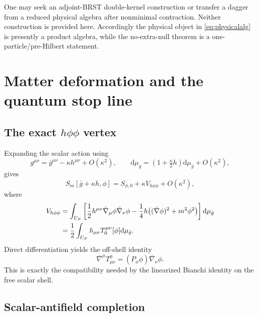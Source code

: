 \documentclass[11pt]{article}
\theoremstyle{definition}
\theoremstyle{remark}
\newcommand{\U}{U_{F}}
\newcommand{\gbar}{\bar g}
\newcommand{\dd}{\mathrm d}
\begin{document}
One may seek an adjoint-BRST double-kernel construction or transfer a dagger from a
reduced physical algebra after nonminimal contraction.  Neither construction is
provided here.  Accordingly the physical object in \cref{eq:physicalalg} is presently
a product algebra, while the no-extra-null theorem is a one-particle/pre-Hilbert
statement.

\section{Matter deformation and the quantum stop line}

\subsection{The exact \texorpdfstring{$h\phi\phi$}{h-phi-phi} vertex}

Expanding the scalar action using
\begin{equation}
 g^{\mu\nu}=\gbar^{\mu\nu}-\kappa h^{\mu\nu}+O(\kappa^2),
 \qquad
 \dd\mu_g=(1+\tfrac\kappa2h)\dd\mu_{\gbar}+O(\kappa^2),
\end{equation}
gives
\begin{equation}
 S_m[\gbar+\kappa h,\phi]
 =S_{\phi,0}+\kappa V_{h\phi\phi}+O(\kappa^2),
\end{equation}
where
\begin{align}
 V_{h\phi\phi}
 &=\int_{\U}\left[
 \frac12h^{\mu\nu}\bar\nabla_\mu\phi\bar\nabla_\nu\phi
 -\frac14h\bigl((\bar\nabla\phi)^2+m^2\phi^2\bigr)
 \right]\dd\mu_{\gbar}\notag\\
 &=\frac12\int_{\U}h_{\mu\nu}T_0^{\mu\nu}[\phi]\dd\mu_{\gbar}.
 \label{eq:hphiphi}
\end{align}
Direct differentiation yields the off-shell identity
\begin{equation}
 \bar\nabla^\mu T^0_{\mu\nu}=(P_\phi\phi)\bar\nabla_\nu\phi.
 \label{eq:stressdiv}
\end{equation}
This is exactly the compatibility needed by the linearized Bianchi identity on the free
scalar shell.

\subsection{Scalar-antifield completion}
\end{document}
